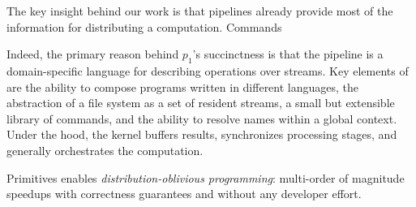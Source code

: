 \documentclass[sigplan,10pt,review,anonymous]{acmart}
\newcommand{\eg}{{\em e.g.}, }
\begin{document}
% 
% 
% 
% 
% 
% 
% 
% 



The key insight behind our work is that \unix pipelines already provide most of the information for distributing a computation.
Commands 

Indeed, the primary reason behind $p_1$'s succinctness is that the pipeline is a domain-specific language for describing operations over streams.
Key elements of \unix are the ability to compose programs written in different languages, the abstraction of a file system as a set of resident streams, a small but extensible library of commands, and the ability to resolve names within a global context.
Under the hood, the \unix kernel buffers results, synchronizes processing stages, and generally orchestrates the computation.


Primitives 
\sys enables \emph{distribution-oblivious programming}: 
  multi-order of magnitude speedups with correctness guarantees and without any developer effort.
\end{document}
